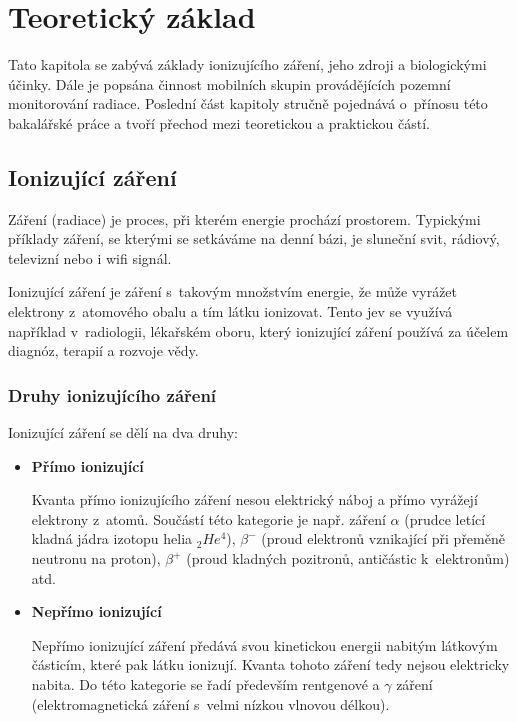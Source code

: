 \chapter{Teoretický základ}
\label{2-teorie} Tato kapitola se zabývá základy ionizujícího záření,
jeho zdroji a biologickými účinky. Dále je popsána činnost mobilních
skupin provádějících pozemní monitorování radiace. Poslední část
kapitoly stručně pojednává o~přínosu této bakalářské práce a tvoří
přechod mezi teoretickou a praktickou částí.

\section{Ionizující záření}
	
Záření (radiace) je proces, při kterém energie prochází
prostorem. Typickými příklady záření, se kterými se setkáváme na denní
bázi, je sluneční svit, rádiový, televizní nebo i wifi signál.

Ionizující záření je záření s~takovým množstvím energie, že může
vyrážet elektrony z~atomového obalu a tím látku ionizovat. Tento jev
se využívá například v~radiologii, lékařském oboru, který ionizující
záření používá za účelem diagnóz, terapií a rozvoje vědy. \citep{who}

\subsection{Druhy ionizujícího záření} Ionizující záření se dělí na
dva druhy: \cite{ionZarUllman} \cite{CEZ}

\begin{itemize}
	\item \textbf{Přímo ionizující}
	
		Kvanta přímo ionizujícího záření nesou elektrický
náboj a přímo vyrážejí elektrony z~atomů. Součástí této kategorie je
např. záření $\alpha$ (prudce letící kladná jádra izotopu helia
$_{2}He^{4}$), $\beta^{-}$ (proud elektronů vznikající při přeměně
neutronu na proton), $\beta^{+}$ (proud kladných pozitronů, antičástic
k~elektronům) atd.
		 
	\item \textbf{Nepřímo ionizující}
	
		Nepřímo ionizující záření předává svou kinetickou
energii nabitým látkovým částicím, které pak látku ionizují. Kvanta
tohoto záření tedy nejsou elektricky nabita. Do této kategorie se řadí
především rentgenové a $\gamma$ záření (elektromagnetická záření
s~velmi nízkou vlnovou délkou).
\end{itemize}


